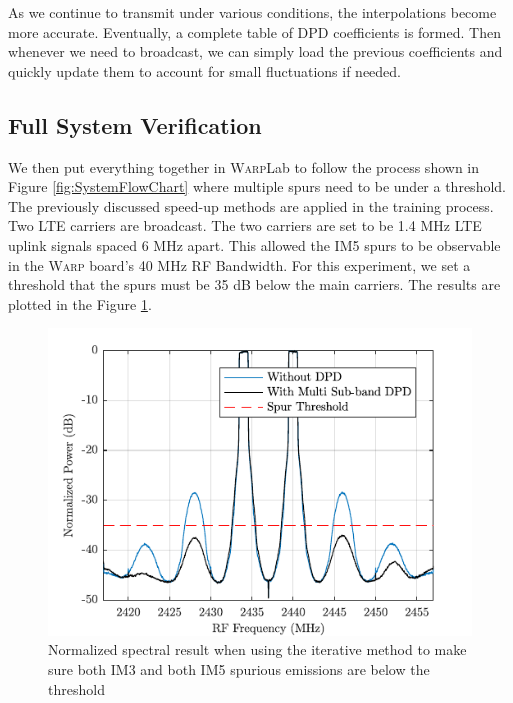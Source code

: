 As we continue to transmit under various conditions, the interpolations become more accurate. Eventually, a complete table of DPD coefficients is formed. Then whenever we need to broadcast, we can simply load the previous coefficients and quickly update them to account for small fluctuations if needed. 

\subsection{Full System Verification}
We then put everything together in \textsc{Warp}Lab to follow the process shown in Figure \ref{fig:SystemFlowChart} where multiple spurs need to be under a threshold. The previously discussed speed-up methods are applied in the training process. Two LTE carriers are broadcast. The two carriers are set to be 1.4 MHz LTE uplink signals spaced 6 MHz apart. This allowed the IM5 spurs to be observable in the \textsc{Warp} board's 40 MHz RF Bandwidth. For this experiment, we set a threshold that the spurs must be 35 dB below the main carriers. The results are plotted in the Figure \ref{fig:IM5}.

\begin{figure}
	\centering
	\includegraphics[]{IM5Spectrum}
	\caption{Normalized spectral result when using the iterative method to make sure both IM3 and both IM5 spurious emissions are below the threshold}
	\label{fig:IM5}
\end{figure}

